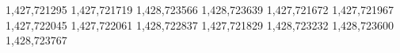 1,427,721295
1,427,721719
1,428,723566
1,428,723639
1,427,721672
1,427,721967
1,427,722045
1,427,722061
1,428,722837
1,427,721829
1,428,723232
1,428,723600
1,428,723767



